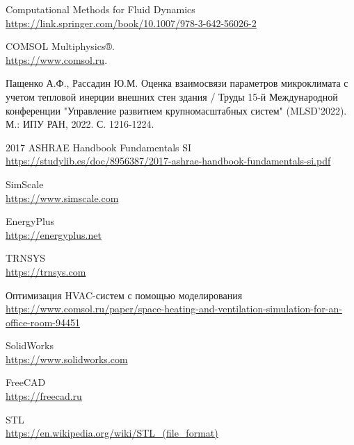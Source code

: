 \documentclass[a4paper,article,14pt]{extarticle}
\begin{document}


\tableofcontents
\pagebreak










\newpage
\begin{thebibliography}{1}

 Computational Methods for Fluid Dynamics\\
\url{https://link.springer.com/book/10.1007/978-3-642-56026-2}

 COMSOL Multiphysics®﻿.\\
\url{https://www.comsol.ru}.

 Пащенко А.Ф., Рассадин Ю.М. Оценка взаимосвязи параметров микроклимата с учетом тепловой инерции внешних стен здания / Труды 15-й Международной конференции "Управление развитием крупномасштабных систем" (MLSD’2022). М.: ИПУ РАН, 2022. С. 1216-1224.

 2017 ASHRAE Handbook Fundamentals SI \\
\url{https://studylib.es/doc/8956387/2017-ashrae-handbook-fundamentals-si.pdf}

 SimScale\\
\url{https://www.simscale.com}

 EnergyPlus\\
\url{https://energyplus.net}

 TRNSYS\\
\url{https://trnsys.com}

 Оптимизация HVAC-систем с помощью моделирования\\
\url{https://www.comsol.ru/paper/space-heating-and-ventilation-simulation-for-an-office-room-94451}

 SolidWorks\\
\url{https://www.solidworks.com}

 FreeCAD\\
\url{https://freecad.ru}

 STL\\
\url{https://en.wikipedia.org/wiki/STL_(file_format)}


\end{thebibliography}
\end{document}
